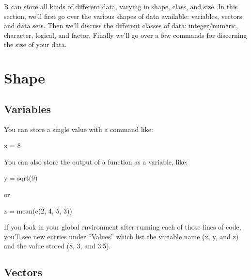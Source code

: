 \documentclass[
]{book}
\newenvironment{Shaded}{\begin{snugshade}}{\end{snugshade}}
\newcommand{\DecValTok}[1]{\textcolor[rgb]{0.00,0.00,0.81}{#1}}
\newcommand{\FunctionTok}[1]{\textcolor[rgb]{0.00,0.00,0.00}{#1}}
\newcommand{\NormalTok}[1]{#1}
\newcommand{\OtherTok}[1]{\textcolor[rgb]{0.56,0.35,0.01}{#1}}
\begin{document}
R can store all kinds of different data, varying in shape, class, and size. In this section, we'll first go over the various shapes of data available: variables, vectors, and data sets. Then we'll discuss the different classes of data: integer/numeric, character, logical, and factor. Finally we'll go over a few commands for discerning the size of your data.

\hypertarget{shape}{%
\section{Shape}\label{shape}}

\hypertarget{variables}{%
\subsection{Variables}\label{variables}}

You can store a single value with a command like:

\begin{Shaded}
\begin{Highlighting}[]
\NormalTok{x }\OtherTok{=} \DecValTok{8} 
\end{Highlighting}
\end{Shaded}

You can also store the output of a function as a variable, like:

\begin{Shaded}
\begin{Highlighting}[]
\NormalTok{y }\OtherTok{=} \FunctionTok{sqrt}\NormalTok{(}\DecValTok{9}\NormalTok{) }
\end{Highlighting}
\end{Shaded}

or

\begin{Shaded}
\begin{Highlighting}[]
\NormalTok{z }\OtherTok{=} \FunctionTok{mean}\NormalTok{(}\FunctionTok{c}\NormalTok{(}\DecValTok{2}\NormalTok{, }\DecValTok{4}\NormalTok{, }\DecValTok{5}\NormalTok{, }\DecValTok{3}\NormalTok{)) }
\end{Highlighting}
\end{Shaded}

If you look in your global environment after running each of those lines of code, you'll see new entries under ``Values'' which list the variable name (x, y, and z) and the value stored (8, 3, and 3.5).

\hypertarget{vectors}{%
\subsection{Vectors}\label{vectors}}
\end{document}
